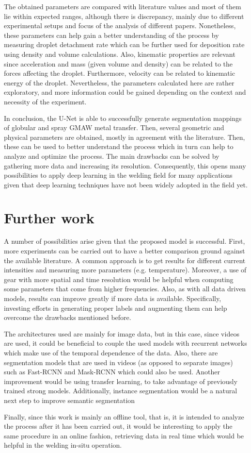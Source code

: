 The obtained parameters are compared with literature values and most of them lie within expected ranges, although there is discrepancy, mainly due to different experimental setups and focus of the analysis of different papers. Nonetheless, these parameters can help gain a better understanding of the process by measuring droplet detachment rate which can be further used for deposition rate using density and volume calculations. Also, kinematic properties are relevant since acceleration and mass (given volume and density) can be related to the forces affecting the droplet. Furthermore, velocity can be related to kinematic energy of the droplet. Nevertheless, the parameters calculated here are rather exploratory, and more information could be gained depending on the context and necessity of the experiment.

In conclusion, the U-Net is able to successfully generate segmentation mappings of globular and spray GMAW metal transfer. Then, several geometric and physical parameters are obtained, mostly in agreement with the literature. Then, these can be used to better understand the process which in turn can help to analyze and optimize the process. The main drawbacks can be solved by gathering more data and increasing its resolution. Consequently, this opens many possibilities to apply deep learning in the welding field for many applications given that deep learning techniques have not been widely adopted in the field yet.


\section{Further work}

A number of possibilities arise given that the proposed model is successful. First, more experiments can be carried out to have a better comparison ground against the available literature. A common approach is to get results for different current intensities and measuring more parameters (e.g. temperature). Moreover, a use of gear with more spatial and time resolution would be helpful when computing some parameters that come from higher frequencies. Also, as with all data driven models, results can improve greatly if more data is available. Specifically, investing efforts in generating proper labels and augmenting them can help overcome the drawbacks mentioned before.

The architectures used are mainly for image data, but in this case, since videos are used, it could be beneficial to couple the used models with recurrent networks which make use of the temporal dependence of the data. Also, there are segmentation models that are used in videos (as opposed to separate images) such as Fast-RCNN and Mask-RCNN which could also be used. Another improvement would be using transfer learning, to take advantage of previously trained strong models. Additionally, instance segmentation would be a natural next step to improve semantic segmentation

Finally, since this work is mainly an offline tool, that is, it is intended to analyze the process after it has been carried out, it would be interesting to apply the same procedure in an online fashion, retrieving data in real time which would be helpful in the welding in-situ operation.
